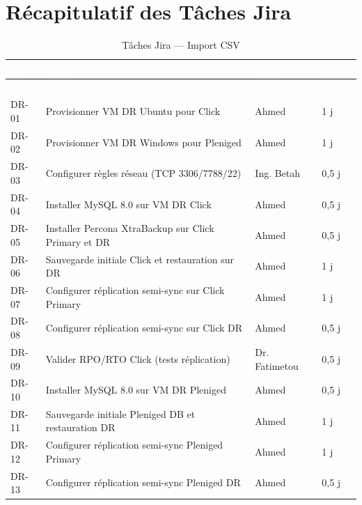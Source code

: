 \documentclass[a4paper,11pt]{article}
\begin{document}
\section{Récapitulatif des Tâches Jira}

\begin{longtable}{|l|p{7cm}|l|l|}
\caption{Tâches Jira — Import CSV} \\
\hline
\rowcolor{bnmblue}\textcolor{white}{\textbf{ID}} & \textcolor{white}{\textbf{Titre}} & \textcolor{white}{\textbf{Resp.}} & \textcolor{white}{\textbf{Durée}} \\
\hline
\endfirsthead
\hline
\rowcolor{bnmblue}\textcolor{white}{\textbf{ID}} & \textcolor{white}{\textbf{Titre}} & \textcolor{white}{\textbf{Resp.}} & \textcolor{white}{\textbf{Durée}} \\
\hline
\endhead
DR-01 & Provisionner VM DR Ubuntu pour Click & Ahmed & 1 j \\
\hline
\rowcolor{bnmlightgray}
DR-02 & Provisionner VM DR Windows pour Pleniged & Ahmed & 1 j \\
\hline
DR-03 & Configurer règles réseau (TCP 3306/7788/22) & Ing. Betah & 0,5 j \\
\hline
\rowcolor{bnmlightgray}
DR-04 & Installer MySQL 8.0 sur VM DR Click & Ahmed & 0,5 j \\
\hline
DR-05 & Installer Percona XtraBackup sur Click Primary et DR & Ahmed & 0,5 j \\
\hline
\rowcolor{bnmlightgray}
DR-06 & Sauvegarde initiale Click et restauration sur DR & Ahmed & 1 j \\
\hline
DR-07 & Configurer réplication semi-sync sur Click Primary & Ahmed & 1 j \\
\hline
\rowcolor{bnmlightgray}
DR-08 & Configurer réplication semi-sync sur Click DR & Ahmed & 0,5 j \\
\hline
DR-09 & Valider RPO/RTO Click (tests réplication) & Dr. Fatimetou & 0,5 j \\
\hline
\rowcolor{bnmlightgray}
DR-10 & Installer MySQL 8.0 sur VM DR Pleniged & Ahmed & 0,5 j \\
\hline
DR-11 & Sauvegarde initiale Pleniged DB et restauration DR & Ahmed & 1 j \\
\hline
\rowcolor{bnmlightgray}
DR-12 & Configurer réplication semi-sync Pleniged Primary & Ahmed & 1 j \\
\hline
DR-13 & Configurer réplication semi-sync Pleniged DR & Ahmed & 0,5 j \\

\end{longtable}
\end{document}

